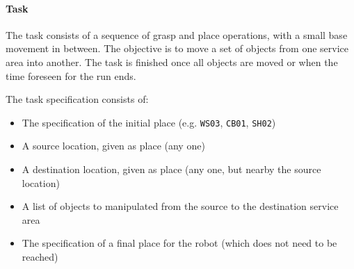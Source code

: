 \paragraph{Task}
 The task consists of a sequence of grasp and place operations, with a small base movement in between. The objective is to move a set of objects from one service area into another. The task is finished once all objects are moved or when the time foreseen for the run ends.
\par
The task specification consists of:
\begin{itemize}
	\item The specification of the initial place (e.g. \texttt{WS03}, \texttt{CB01}, \texttt{SH02})
	\item A source location, given as place (any one)
	\item A destination location, given as place (any one, but nearby the source location)
	\item A list of objects to manipulated from the source to the destination service area
	\item The specification of a final place for the robot (which does not need to be reached)
\end{itemize}

